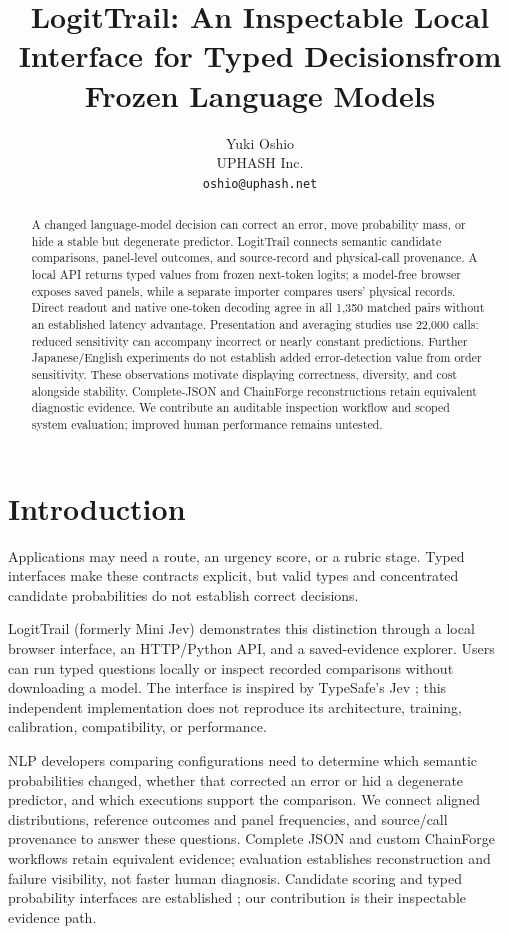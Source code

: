\documentclass[11pt]{article}
\title{LogitTrail: An Inspectable Local Interface for Typed Decisions\newline from Frozen Language Models}
\author{Yuki Oshio \\
  UPHASH Inc. \\
  \texttt{oshio@uphash.net}}
\newcommand{\system}{LogitTrail}
\begin{document}
\maketitle

\begin{abstract}
A changed language-model decision can correct an error, move probability mass, or hide a stable but degenerate predictor. \system{} connects semantic candidate comparisons, panel-level outcomes, and source-record and physical-call provenance. A local API returns typed values from frozen next-token logits; a model-free browser exposes saved panels, while a separate importer compares users' physical records. Direct readout and native one-token decoding agree in all 1,350 matched pairs without an established latency advantage. Presentation and averaging studies use 22,000 calls: reduced sensitivity can accompany incorrect or nearly constant predictions. Further Japanese/English experiments do not establish added error-detection value from order sensitivity. These observations motivate displaying correctness, diversity, and cost alongside stability. Complete-JSON and ChainForge reconstructions retain equivalent diagnostic evidence. We contribute an auditable inspection workflow and scoped system evaluation; improved human performance remains untested.
\end{abstract}

\section{Introduction}
Applications may need a route, an urgency score, or a rubric stage. Typed interfaces make these contracts explicit, but valid types and concentrated candidate probabilities do not establish correct decisions.

\system{} (formerly Mini Jev) demonstrates this distinction through a local browser interface, an HTTP/Python API, and a saved-evidence explorer. Users can run typed questions locally or inspect recorded comparisons without downloading a model. The interface is inspired by TypeSafe's Jev \citep{typesafe2026jev,typesafeapi}; this independent implementation does not reproduce its architecture, training, calibration, compatibility, or performance.

NLP developers comparing configurations need to determine which semantic probabilities changed, whether that corrected an error or hid a degenerate predictor, and which executions support the comparison. We connect aligned distributions, reference outcomes and panel frequencies, and source/call provenance to answer these questions. Complete JSON and custom ChainForge workflows retain equivalent evidence; evaluation establishes reconstruction and failure visibility, not faster human diagnosis. Candidate scoring and typed probability interfaces are established \citep{schick2021pet,ma2025inferring,lmqlscoring}; our contribution is their inspectable evidence path.
\end{document}
